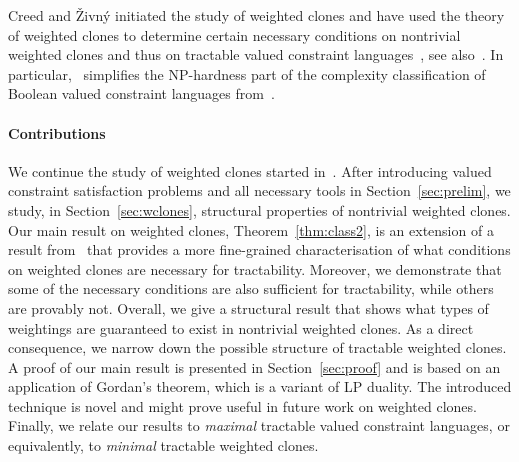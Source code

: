 \documentclass[11pt, reqno]{article}
\theoremstyle{remark}
\begin{document}
Creed and \v{Z}ivn\'y initiated the study of weighted clones and have used the theory of weighted clones to determine
certain necessary conditions on nontrivial weighted clones and thus on
tractable valued constraint languages~\cite{cz11:cp-mwc}, see
also~\cite{cccjz13:sicomp}. In particular,~\cite{cz11:cp-mwc} simplifies the
NP-hardness part of the complexity classification of Boolean valued constraint
languages from~\cite{Cohen06:complexitysoft}. 

\paragraph{Contributions}
%
We continue the study of weighted clones started
in~\cite{cz11:cp-mwc,cccjz13:sicomp}. After introducing valued constraint
satisfaction problems and all necessary tools in Section~\ref{sec:prelim}, we
study, in Section~\ref{sec:wclones}, structural properties of nontrivial
weighted clones.  
%
Our main result on weighted clones, Theorem~\ref{thm:class2}, is an extension of
a result from~\cite{cccjz13:sicomp} that provides a more fine-grained
characterisation of what conditions on weighted clones are necessary for
tractability. Moreover, we demonstrate that some of the necessary conditions are
also sufficient for tractability, while others are provably not. Overall, we
give a structural result that shows what types of weightings are guaranteed to
exist in nontrivial weighted clones. As a direct consequence, we narrow down the
possible structure of tractable weighted clones.
%
A proof of our main result is presented in Section~\ref{sec:proof} and is based
on an application of Gordan's theorem, which is a variant of LP duality. The
introduced technique is novel and might prove useful in future work on weighted
clones. 
%
Finally, we relate our results to \emph{maximal} tractable valued constraint
languages, or equivalently, to \emph{minimal} tractable weighted clones.
%
\end{document}
